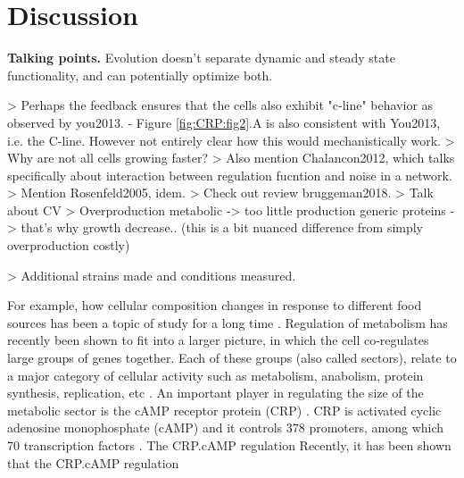
\section*{Discussion}

\textbf{Talking points.} Evolution doesn't separate dynamic and steady state functionality, and can potentially optimize both.

> Perhaps the feedback ensures that the cells also exhibit "c-line" behavior as observed by you2013.
- Figure \ref{fig:CRP:fig2}.A is also consistent with You2013, i.e. the C-line. However not entirely clear how this would mechanistically work.
> Why are not all cells growing faster?
> Also mention Chalancon2012, which talks specifically about interaction between regulation fucntion and noise in a network.
> Mention Rosenfeld2005, idem.
> Check out review bruggeman2018.
> Talk about CV
> Overproduction metabolic -> too little production generic proteins -> that's why growth decrease.. (this is a bit nuanced difference from simply overproduction costly)

> Additional strains made and conditions measured.

For example, how cellular composition changes in response to different food sources has been a topic of study for a long time \cite{Schaechter1958}.
%
Regulation of metabolism has recently been shown to fit into a larger picture, in which the cell co-regulates large groups of genes together.
Each of these groups (also called sectors), relate to a major 
%
category of cellular activity such as 
metabolism, anabolism, protein synthesis, replication, etc 
\cite{Klumpp2009, You2013, Scott2014, Hui2015, Hermsen2015, Erickson2017}.
%
%
An important player in regulating the size of the metabolic sector is the cAMP receptor protein (CRP) \cite{Keseler2017, Grainger2005, Robinson1998, Zheng2004, Gorke2008, Fic2009, Green2014}.
%
CRP is activated cyclic adenosine monophosphate (cAMP) and it controls 378 promoters, among which 70 transcription factors \cite{Green2014, Shimada2011}.
%
The CRP.cAMP regulation 
%
Recently, it has been shown that the CRP.cAMP regulation 

